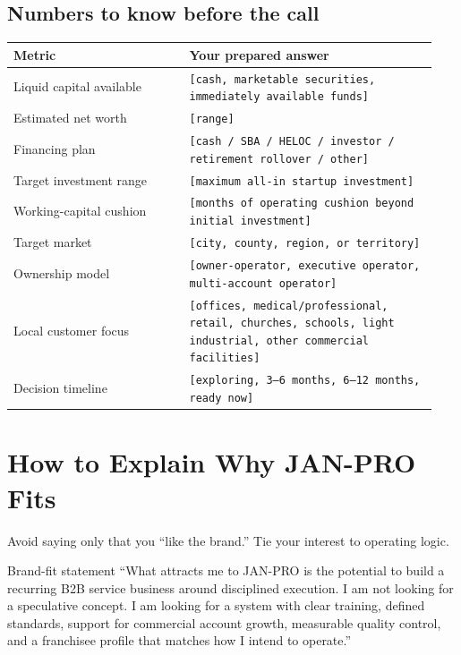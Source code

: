 \documentclass[11pt]{article}
\newcommand{\placeholder}[1]{\textcolor{accent}{\texttt{[#1]}}}
\newcommand{\janpro}{JAN-PRO}
\begin{document}
\subsection{Numbers to know before the call}

\begin{longtable}{>{\raggedright\arraybackslash}p{0.39\linewidth}>{\raggedright\arraybackslash}p{0.55\linewidth}}
\toprule
\textbf{Metric} & \textbf{Your prepared answer} \\
\midrule
Liquid capital available & \placeholder{cash, marketable securities, immediately available funds} \\
Estimated net worth & \placeholder{range} \\
Financing plan & \placeholder{cash / SBA / HELOC / investor / retirement rollover / other} \\
Target investment range & \placeholder{maximum all-in startup investment} \\
Working-capital cushion & \placeholder{months of operating cushion beyond initial investment} \\
Target market & \placeholder{city, county, region, or territory} \\
Ownership model & \placeholder{owner-operator, executive operator, multi-account operator} \\
Local customer focus & \placeholder{offices, medical/professional, retail, churches, schools, light industrial, other commercial facilities} \\
Decision timeline & \placeholder{exploring, 3--6 months, 6--12 months, ready now} \\
\bottomrule
\end{longtable}

\section{How to Explain Why \janpro{} Fits}

Avoid saying only that you ``like the brand.'' Tie your interest to operating logic.

\begin{scriptbox}{Brand-fit statement}
``What attracts me to \janpro{} is the potential to build a recurring B2B service business around disciplined execution. I am not looking for a speculative concept. I am looking for a system with clear training, defined standards, support for commercial account growth, measurable quality control, and a franchisee profile that matches how I intend to operate.''
\end{scriptbox}
\end{document}
